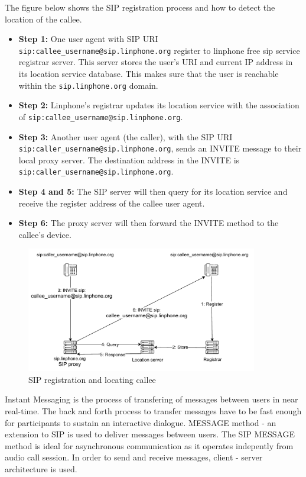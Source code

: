     \noindent The figure below shows the SIP registration process and how to detect the location of the callee. 
    \sloppy
    \begin{itemize}
        \item \textbf {Step 1:} One user agent with SIP URI \texttt{sip:callee\_username@sip.linphone.org} register to linphone free sip service registrar server. 
        This server stores the user’s URI and current IP address in its location service database. 
        This makes sure that the user is reachable within the \texttt{sip.linphone.org} domain. 
        \item \textbf {Step 2:} Linphone’s registrar updates its location service with the association of \texttt{sip:\allowbreak callee\_username@sip.linphone.org}.
        \item \textbf {Step 3:} Another user agent (the caller), with the SIP URI \texttt{\allowbreak sip:caller\_username\allowbreak @sip.linphone.org}, 
        sends an INVITE message to their local proxy server. 
        The destination address in the INVITE is \texttt{sip:caller\_username@sip.linphone.org}.
        \item \textbf {Step 4 and 5:} The SIP server will then query for its location service and receive the register address of the callee user agent.
        \item \textbf {Step 6:} The proxy server will then forward the INVITE method to the callee’s device. 
    \end{itemize}

    \begin{figure}[H]
        \centering
        \includegraphics[width=0.9\textwidth, height=0.4\textheight]{image/Locating_callee.pdf} 
        \caption{SIP registration and locating callee}
        \label{fig:locating_callee}
    \end{figure}

    Instant Messaging is the process of transfering of messages between users in near real-time.
    The back and forth process to transfer messages have to be fast enough for participants to sustain an interactive dialogue.
    MESSAGE method - an extension to SIP is used to deliver messages between users. 
    The SIP MESSAGE method is ideal for asynchronous communication as it operates indepently from audio call session.
    In order to send and receive messages, client - server architecture is used.  

